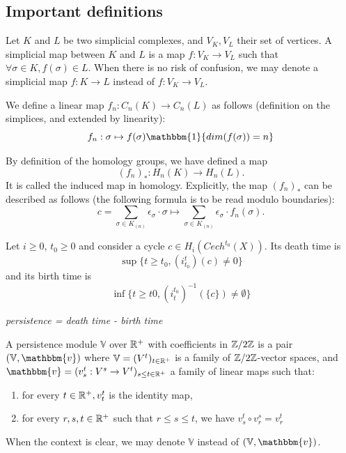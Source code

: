 \subsection{Important definitions}

\begin{definition}
    Let $K$ and $L$ be two simplicial complexes, and $V_K, V_L$ their set of 
    vertices. A simplicial map between $K$ and $L$ is a map $f : V_K \to V_L$ such that
    $\forall \sigma \in K, f(\sigma) \in L$. When there is no risk of
    confusion, we may denote a simplicial map $f : K \to L$ instead of $f :
    V_K \to V_L$.
    
    We define a linear map $f_n : C_n(K) \to C_n(L)$ as follows (definition on the simplices, and
    extended by linearity):
    $$
    f_n : \sigma \mapsto f(\sigma) \mathbbm{1}\{dim(f(\sigma)) = n\}
    $$
\end{definition}

\begin{definition}
    By definition of the homology groups, we have defined a map 
    $$(f_n)_* : H_n(K) \to H_n(L).$$ It is called the induced map in homology.
    Explicitly, the map $(f_n)_*$ can be described as follows (the following formula is to be
    read modulo boundaries):
    $$c = \sum_{\sigma \in K_{(n)}} \epsilon_{\sigma} \cdot \sigma \mapsto
    \sum_{\sigma \in K_{(n)}} \epsilon_{\sigma} \cdot f_n(\sigma).$$
\end{definition}

\begin{definition}
    Let $i \ge 0$, $t_0 \ge 0$ and consider a cycle $c \in
    H_i(Cech^{t_0}(X))$. Its death time is
    $$\sup\{t \ge t_0, (i^t_{t_0}) (c) \neq 0\}$$
    and its birth time is
    $$\inf\{t \ge t0, (i^{t_0}_t)^{-1}(\{c\}) \neq \emptyset\}$$

    \begin{center}
        {\it persistence = death time - birth time}
    \end{center}
\end{definition}

\begin{definition}
    A persistence module $\mathbb{V}$ over $\mathbb{R}^+$ with coefficients in
    $\mathbb{Z}/2\mathbb{Z}$ is a pair $(\mathbb{V}, \mathbbm{v})$ where $\mathbb{V} = (V^t)_{t
    \in \mathbb{R}^+}$ is a family of $\mathbb{Z}/2\mathbb{Z}$-vector spaces, and $\mathbbm{v} = (v_s^t
    : V^s \to V^t)_{s \le t \in \R^+}$ a family of linear maps such that:
    \begin{enumerate}
        \item for every $t \in \mathbb{R}^+, v^t_t$ is the identity map,
        \item for every $r,s,t \in \mathbb{R}^+$ such that $r \le s \le t$, we have
        $v_s^t \circ v_r^s = v_r^t$
    \end{enumerate}
When the context is clear, we may denote $\mathbb{V}$ instead of $(\mathbb{V}, \mathbbm{v})$. 
\end{definition}

